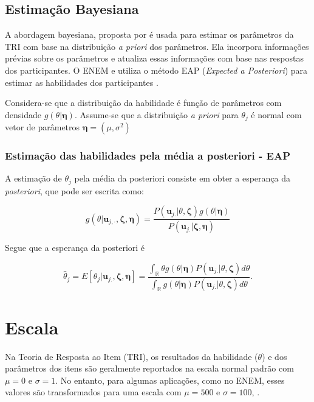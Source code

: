 \subsection{Estimação Bayesiana}

A abordagem bayesiana, proposta por  é usada para estimar os parâmetros da TRI com base na distribuição \textit{a priori} dos parâmetros. Ela incorpora informações prévias sobre os parâmetros e atualiza essas informações com base nas respostas dos participantes. O ENEM e utiliza o método EAP (\textit{Expected a Posteriori}) para estimar as habilidades dos participantes \cite{inep2021}.

Considera-se que a distribuição da habilidade é função de parâmetros com densidade $g(\theta| \boldsymbol{\eta})$. Assume-se que a distribuição \textit{a priori} para $\theta_j$ é normal com vetor de parâmetros
$\boldsymbol{\eta} = (\mu, \sigma^2)$ 

\subsubsection{Estimação das habilidades pela média a posteriori - EAP}

A estimação de \(\theta_j\) pela média da posteriori consiste em obter a esperança da \textit{posteriori}, que pode ser escrita como:

\[
g(\theta | \boldsymbol{u}_{j,\cdot}, \boldsymbol{\zeta}, \boldsymbol{\eta}) = \dfrac{P(\boldsymbol{u}_{j.} | \theta, \boldsymbol{\zeta}) g(\theta | \boldsymbol{\eta})}{P(\boldsymbol{u}_{j.} | \boldsymbol{\zeta}, \boldsymbol{\eta})}
\]

Segue que a esperança da posteriori é

\[
\hat{\theta}_j = E[\theta_j | \boldsymbol{u}_{j.}, \boldsymbol{\zeta}, \boldsymbol{\eta}] = \dfrac{\int_{\mathbb{R}} \theta g(\theta | \boldsymbol{\eta}) P(\boldsymbol{u}_{j.} | \theta, \boldsymbol{\zeta}) d\theta}{\int_{\mathbb{R}} g(\theta |\boldsymbol{\eta}) P(\boldsymbol{u}_{j.} | \theta, \boldsymbol{\zeta}) d\theta}.
\]


\section{Escala}




Na Teoria de Resposta ao Item (TRI), os resultados da habilidade ($\theta$) e dos parâmetros dos itens são geralmente reportados na escala normal padrão com $\mu = 0$ e $\sigma = 1$. No entanto, para algumas aplicações, como no ENEM, esses valores são transformados para uma escala com $\mu = 500$ e $\sigma = 100$, %
\cite{inep2021procedimento}.

